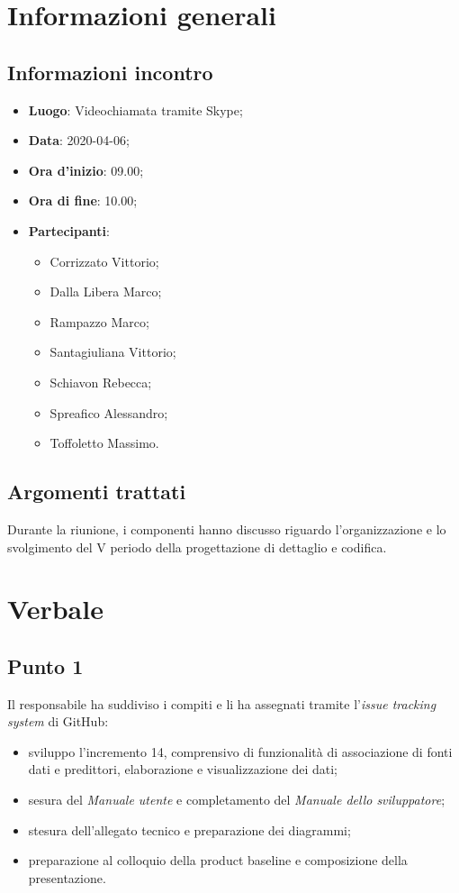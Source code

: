 \section{Informazioni generali}
    \subsection{Informazioni incontro}
        \begin{itemize}
            \item \textbf{Luogo}: Videochiamata tramite Skype;
            \item \textbf{Data}: 2020-04-06;
            \item \textbf{Ora d'inizio}: 09.00;
            \item \textbf{Ora di fine}: 10.00;
            \item \textbf{Partecipanti}: \begin{itemize}
                \item Corrizzato Vittorio;
                \item Dalla Libera Marco;
                \item Rampazzo Marco;
                \item Santagiuliana Vittorio;
                \item Schiavon Rebecca;
                \item Spreafico Alessandro;
                \item Toffoletto Massimo.
            \end{itemize}
        \end{itemize}
    \subsection{Argomenti trattati}
        Durante la riunione, i componenti hanno discusso riguardo l'organizzazione e lo svolgimento del V periodo della progettazione di dettaglio e codifica.
\section{Verbale}
    \subsection{Punto 1}
        Il responsabile ha suddiviso i compiti e li ha assegnati tramite l'\textit{issue tracking system} di GitHub:
        \begin{itemize}
            \item sviluppo l'incremento 14, comprensivo di funzionalità di associazione di fonti dati e predittori, elaborazione e visualizzazione dei dati;
            \item sesura del \textit{Manuale utente} e completamento del \textit{Manuale dello sviluppatore};
            \item stesura dell'allegato tecnico e preparazione dei diagrammi; 
            \item preparazione al colloquio della product baseline e composizione della presentazione.
        \end{itemize}

